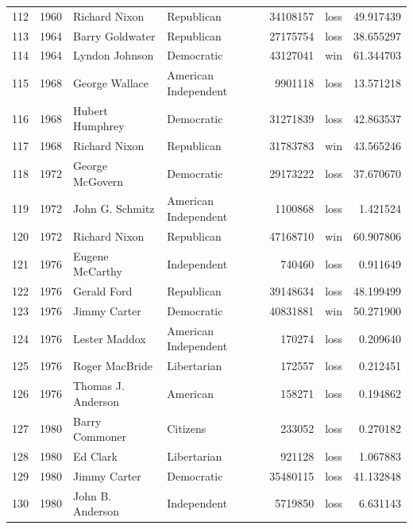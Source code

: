 \documentclass[
  letterpaper,
  DIV=11,
  numbers=noendperiod]{scrreprt}
\begin{document}
\begin{tabular}{lrllrlr}
112 &  1960 &           Richard Nixon &             Republican &      34108157 &   loss &  49.917439 \\
113 &  1964 &         Barry Goldwater &             Republican &      27175754 &   loss &  38.655297 \\
114 &  1964 &          Lyndon Johnson &             Democratic &      43127041 &    win &  61.344703 \\
115 &  1968 &          George Wallace &   American Independent &       9901118 &   loss &  13.571218 \\
116 &  1968 &         Hubert Humphrey &             Democratic &      31271839 &   loss &  42.863537 \\
117 &  1968 &           Richard Nixon &             Republican &      31783783 &    win &  43.565246 \\
118 &  1972 &         George McGovern &             Democratic &      29173222 &   loss &  37.670670 \\
119 &  1972 &         John G. Schmitz &   American Independent &       1100868 &   loss &   1.421524 \\
120 &  1972 &           Richard Nixon &             Republican &      47168710 &    win &  60.907806 \\
121 &  1976 &         Eugene McCarthy &            Independent &        740460 &   loss &   0.911649 \\
122 &  1976 &             Gerald Ford &             Republican &      39148634 &   loss &  48.199499 \\
123 &  1976 &            Jimmy Carter &             Democratic &      40831881 &    win &  50.271900 \\
124 &  1976 &           Lester Maddox &   American Independent &        170274 &   loss &   0.209640 \\
125 &  1976 &          Roger MacBride &            Libertarian &        172557 &   loss &   0.212451 \\
126 &  1976 &      Thomas J. Anderson &               American &        158271 &   loss &   0.194862 \\
127 &  1980 &          Barry Commoner &               Citizens &        233052 &   loss &   0.270182 \\
128 &  1980 &                Ed Clark &            Libertarian &        921128 &   loss &   1.067883 \\
129 &  1980 &            Jimmy Carter &             Democratic &      35480115 &   loss &  41.132848 \\
130 &  1980 &        John B. Anderson &            Independent &       5719850 &   loss &   6.631143 \\

\end{tabular}
\end{document}
